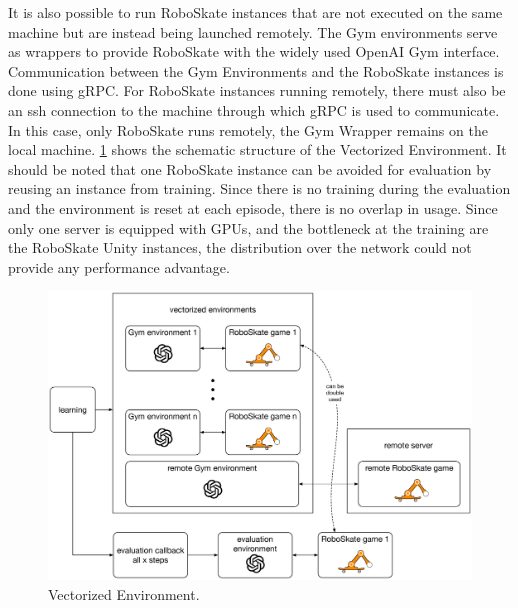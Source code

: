 \documentclass[conference]{IEEEtran}
\begin{document}
It is also possible to run RoboSkate instances that are not executed on the same machine but are instead being launched remotely.
The Gym environments serve as wrappers to provide RoboSkate with the widely used OpenAI Gym interface. Communication between the Gym Environments and the RoboSkate instances is done using gRPC. For RoboSkate instances running remotely, there must also be an ssh connection to the machine through which gRPC is used to communicate. In this case, only RoboSkate runs remotely, the Gym Wrapper remains on the local machine. \figurename  \ref{fig:Vectorized_Environment} shows the schematic structure of the Vectorized Environment. It should be noted that one RoboSkate instance can be avoided for evaluation by reusing an instance from training. Since there is no training during the evaluation and the environment is reset at each episode, there is no overlap in usage.
Since only one server is equipped with GPUs, and the bottleneck at the training are the RoboSkate Unity instances, the distribution over the network could not provide any performance advantage.

\begin{figure}[!t]
  \centering
  \includegraphics[width=1.0\linewidth]{images/Vectorized_Environment.eps}
  \caption{Vectorized Environment.}
\label{fig:Vectorized_Environment}
\end{figure}

\end{document}
